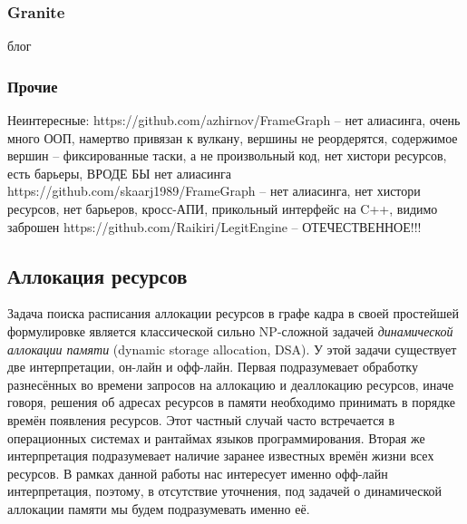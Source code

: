 \subsubsection*{Granite}
блог\cite{GraniteBlogPost}

\subsubsection*{Прочие}
Неинтересные:
https://github.com/azhirnov/FrameGraph -- нет алиасинга, очень много ООП, намертво привязан к вулкану, вершины не реордерятся, содержимое вершин -- фиксированные таски, а не произвольный код, нет хистори ресурсов, есть барьеры, ВРОДЕ БЫ нет алиасинга
https://github.com/skaarj1989/FrameGraph -- нет алиасинга, нет хистори ресурсов, нет барьеров, кросс-АПИ, прикольный интерфейс на C++, видимо заброшен
https://github.com/Raikiri/LegitEngine -- ОТЕЧЕСТВЕННОЕ!!!

\subsection{Аллокация ресурсов}
Задача поиска расписания аллокации ресурсов в графе кадра в своей простейшей формулировке является классической сильно NP-сложной\cite{DSAnpcomplete} задачей \textit{динамической аллокации памяти} (dynamic storage allocation, DSA\cite[с. 226]{10.5555/574848}). У этой задачи существует две интерпретации, он-лайн и офф-лайн. Первая подразумевает обработку разнесённых во времени запросов на аллокацию и деаллокацию ресурсов, иначе говоря, решения об адресах ресурсов в памяти необходимо принимать в порядке времён появления ресурсов. Этот частный случай часто встречается в операционных системах и рантаймах языков программирования. Вторая же интерпретация подразумевает наличие заранее известных времён жизни всех ресурсов. В рамках данной работы нас интересует именно офф-лайн интерпретация, поэтому, в отсутствие уточнения, под задачей о динамической аллокации памяти мы будем подразумевать именно её.

